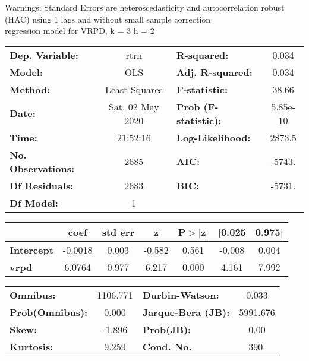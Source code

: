 Warnings: \newline
 [1] Standard Errors are heteroscedasticity and autocorrelation robust (HAC) using 1 lags and without small sample correction\\ 

regression model for VRPD, k = 3 h = 2\begin{center}
\begin{tabular}{lclc}
\toprule
\textbf{Dep. Variable:}    &       rtrn       & \textbf{  R-squared:         } &     0.034   \\
\textbf{Model:}            &       OLS        & \textbf{  Adj. R-squared:    } &     0.034   \\
\textbf{Method:}           &  Least Squares   & \textbf{  F-statistic:       } &     38.66   \\
\textbf{Date:}             & Sat, 02 May 2020 & \textbf{  Prob (F-statistic):} &  5.85e-10   \\
\textbf{Time:}             &     21:52:16     & \textbf{  Log-Likelihood:    } &    2873.5   \\
\textbf{No. Observations:} &        2685      & \textbf{  AIC:               } &    -5743.   \\
\textbf{Df Residuals:}     &        2683      & \textbf{  BIC:               } &    -5731.   \\
\textbf{Df Model:}         &           1      & \textbf{                     } &             \\
\bottomrule
\end{tabular}
\begin{tabular}{lcccccc}
                   & \textbf{coef} & \textbf{std err} & \textbf{z} & \textbf{P$> |$z$|$} & \textbf{[0.025} & \textbf{0.975]}  \\
\midrule
\textbf{Intercept} &      -0.0018  &        0.003     &    -0.582  &         0.561        &       -0.008    &        0.004     \\
\textbf{vrpd}      &       6.0764  &        0.977     &     6.217  &         0.000        &        4.161    &        7.992     \\
\bottomrule
\end{tabular}
\begin{tabular}{lclc}
\textbf{Omnibus:}       & 1106.771 & \textbf{  Durbin-Watson:     } &    0.033  \\
\textbf{Prob(Omnibus):} &   0.000  & \textbf{  Jarque-Bera (JB):  } & 5991.676  \\
\textbf{Skew:}          &  -1.896  & \textbf{  Prob(JB):          } &     0.00  \\
\textbf{Kurtosis:}      &   9.259  & \textbf{  Cond. No.          } &     390.  \\
\bottomrule
\end{tabular}
\end{center}

